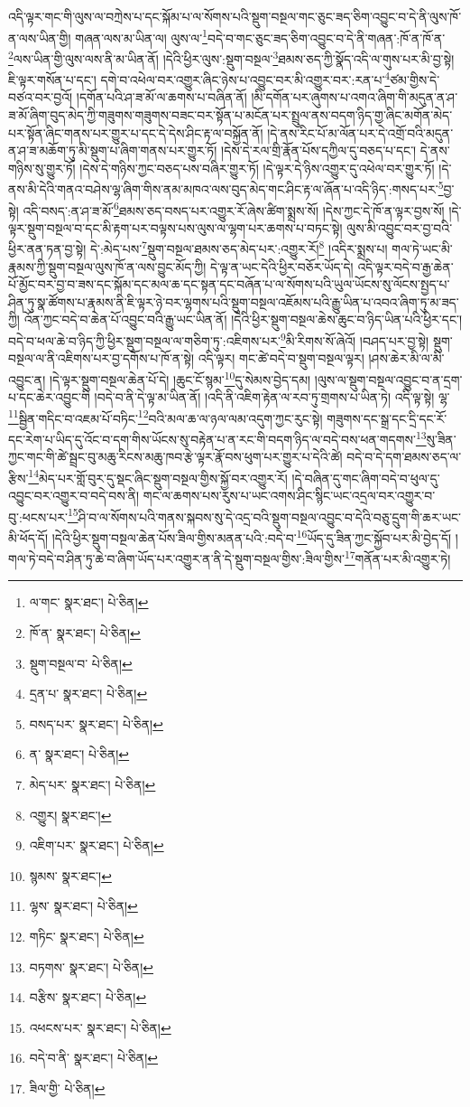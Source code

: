 འདི་ལྟར་གང་གི་ལུས་ལ་བཀྲེས་པ་དང་སྐོམ་པ་ལ་སོགས་པའི་སྡུག་བསྔལ་གང་ཅུང་ཟད་ཅིག་འབྱུང་བ་དེ་ནི་ལུས་ཁོ་ན་ལས་ཡིན་གྱི། གཞན་ལས་མ་ཡིན་ལ། ལུས་ལ་\footnote{ལ་གང་  སྣར་ཐང་།  པེ་ཅིན། }བདེ་བ་གང་ཅུང་ཟད་ཅིག་འབྱུང་བ་དེ་ནི་གཞན་:ཁོ་ན་ཁོ་ན་\footnote{ཁོ་ན་  སྣར་ཐང་།  པེ་ཅིན། }ལས་ཡིན་གྱི་ལུས་ལས་ནི་མ་ཡིན་ནོ། །དེའི་ཕྱིར་ལུས་:སྡུག་བསྔལ་\footnote{སྡུག་བསྔལ་བ་  པེ་ཅིན། }ཐམས་ཅད་ཀྱི་སྣོད་འདི་ལ་གུས་པར་མི་བྱ་སྟེ། ཇི་ལྟར་གསོན་པ་དང་། དགེ་བ་འཕེལ་བར་འགྱུར་ཞིང་ཉེས་པ་འབྱུང་བར་མི་འགྱུར་བར་:རན་པ་\footnote{དྲན་པ་  སྣར་ཐང་།  པེ་ཅིན། }ཙམ་གྱིས་དེ་བཙའ་བར་བྱའོ། །དགོན་པའི་ཤ་ཟ་མོ་ལ་ཆགས་པ་བཞིན་ནོ། །མི་དགོན་པར་ཞུགས་པ་འགའ་ཞིག་གི་མདུན་ན་ཤ་ཟ་མོ་ཞིག་བུད་མེད་ཀྱི་གཟུགས་གཟུགས་བཟང་བར་སྟོན་པ་མངོན་པར་སྤྲུལ་ནས་བདག་ཉིད་གྱ་ཞིང་མགོན་མེད་པར་སྟོན་ཞིང་གནས་པར་གྱུར་པ་དང་དེ་དེས་ཤིང་རྟ་ལ་བསྐྱོན་ནོ། །དེ་ནས་རིང་པོ་མ་ལོན་པར་དེ་འགྲོ་བའི་མདུན་ན་ཤ་ཟ་མཆོག་ཏུ་མི་སྡུག་པ་ཞིག་གནས་པར་གྱུར་ཏོ། །དེས་དེ་རལ་གྲི་རྣོན་པོས་དཀྱིལ་དུ་བཅད་པ་དང་། དེ་ནས་གཉིས་སུ་གྱུར་ཏོ། །དེས་དེ་གཉིས་ཀྱང་བཅད་པས་བཞིར་གྱུར་ཏོ། །དེ་ལྟར་དེ་ཉིས་འགྱུར་དུ་འཕེལ་བར་གྱུར་ཏོ། །དེ་ནས་མི་དེའི་གནའ་བཤེས་ལྷ་ཞིག་གིས་ནམ་མཁའ་ལས་བུད་མེད་གང་ཤིང་རྟ་ལ་ཞོན་པ་འདི་ཉིད་:གསད་པར་\footnote{བསད་པར་  སྣར་ཐང་།  པེ་ཅིན། }བྱ་སྟེ། འདི་བསད་:ན་ཤ་ཟ་མོ་\footnote{ན་  སྣར་ཐང་།  པེ་ཅིན། }ཐམས་ཅད་བསད་པར་འགྱུར་རོ་ཞེས་ཚིག་སྨྲས་སོ། །དེས་ཀྱང་དེ་ཁོ་ན་ལྟར་བྱས་སོ། །དེ་ལྟར་སྡུག་བསྔལ་བ་དང་མི་རྟག་པར་བལྟས་པས་ལུས་ལ་ལྷག་པར་ཆགས་པ་བཏང་སྟེ། ལུས་མི་འབྱུང་བར་བྱ་བའི་ཕྱིར་ནན་ཏན་བྱ་སྟེ། དེ་:མེད་པས་\footnote{མེད་པར་  སྣར་ཐང་།  པེ་ཅིན། }སྡུག་བསྔལ་ཐམས་ཅད་མེད་པར་:འགྱུར་རོ།\footnote{འགྱུར།  སྣར་ཐང་། } །འདིར་སྨྲས་པ། གལ་ཏེ་ཡང་མི་རྣམས་ཀྱི་སྡུག་བསྔལ་ལུས་ཁོ་ན་ལས་བྱུང་མོད་ཀྱི། དེ་ལྟ་ན་ཡང་དེའི་ཕྱིར་བཅོར་ཡོད་དེ། འདི་ལྟར་བདེ་བ་རྒྱ་ཆེན་པོ་མྱོང་བར་བྱ་བ་ཟས་དང་སྐོམ་དང་མལ་ཆ་དང་སྟན་དང་བཞོན་པ་ལ་སོགས་པའི་ཡུལ་ཡོངས་སུ་ལོངས་སྤྱད་པ་ཤིན་ཏུ་སྣ་ཚོགས་པ་རྣམས་ནི་ཇི་ལྟར་ཉེ་བར་ལྷགས་པའི་སྡུག་བསྔལ་འཇོམས་པའི་རྒྱུ་ཡིན་པ་འབའ་ཞིག་ཏུ་མ་ཟད་ཀྱི། འོན་ཀྱང་བདེ་བ་ཆེན་པོ་འབྱུང་བའི་རྒྱུ་ཡང་ཡིན་ནོ། །དེའི་ཕྱིར་སྡུག་བསྔལ་ཆེས་ཆུང་བ་ཉིད་ཡིན་པའི་ཕྱིར་དང་། བདེ་བ་ཕལ་ཆེ་བ་ཉིད་ཀྱི་ཕྱིར་སྡུག་བསྔལ་ལ་གཅིག་ཏུ་:འཇིགས་པར་\footnote{འཇིག་པར་  སྣར་ཐང་།  པེ་ཅིན། }མི་རིགས་སོ་ཞེའོ། །བཤད་པར་བྱ་སྟེ། སྡུག་བསྔལ་ལ་ནི་འཇིགས་པར་བྱ་དགོས་པ་ཁོ་ན་སྟེ། འདི་ལྟར། གང་ཚེ་བདེ་བ་སྡུག་བསྔལ་ལྟར། །ཤས་ཆེར་མི་ལ་མི་འབྱུང་ན། །དེ་ལྟར་སྡུག་བསྔལ་ཆེན་པོ་དེ། །ཆུང་ངོ་སྙམ་\footnote{སྙམས་  སྣར་ཐང་། }དུ་སེམས་བྱེད་དམ། །ལུས་ལ་སྡུག་བསྔལ་འབྱུང་བ་ན་དྲག་པ་དང་ཆེར་འབྱུང་གི །བདེ་བ་ནི་དེ་ལྟ་མ་ཡིན་ནོ། །འདི་ནི་འཇིག་རྟེན་ལ་རབ་ཏུ་གྲགས་པ་ཡིན་ཏེ། འདི་ལྟ་སྟེ། ལྷ་\footnote{ལྷས་  སྣར་ཐང་།  པེ་ཅིན། }སྦྱིན་གདིང་བ་འཇམ་པོ་བཏིང་\footnote{གཏིང་  སྣར་ཐང་།  པེ་ཅིན། }བའི་མལ་ཆ་ལ་ཉལ་ལམ་འདུག་ཀྱང་རུང་སྟེ། གཟུགས་དང་སྒྲ་དང་དྲི་དང་རོ་དང་རེག་པ་ཡིད་དུ་འོང་བ་དག་གིས་ཡོངས་སུ་བརྟེན་པ་ན་རང་གི་བདག་ཉིད་ལ་བདེ་བས་ཕན་གདགས་\footnote{བཏགས་  སྣར་ཐང་།  པེ་ཅིན། }སུ་ཟིན་ཀྱང་གང་གི་ཚེ་སྦྲང་བུ་མཆུ་རིངས་མཆུ་ཁབ་རྩེ་ལྟར་རྣོ་བས་ཕུག་པར་གྱུར་པ་དེའི་ཚེ། བདེ་བ་དེ་དག་ཐམས་ཅད་ལ་རྩིས་\footnote{བརྩིས་  སྣར་ཐང་།  པེ་ཅིན། }མེད་པར་གློ་བུར་དུ་སྡང་ཞིང་སྡུག་བསྔལ་གྱིས་སྐྱོ་བར་འགྱུར་རོ། །དེ་བཞིན་དུ་གང་ཞིག་བདེ་བ་ཕུལ་དུ་འབྱུང་བར་འགྱུར་བ་བདེ་བས་ནི། གང་ལ་ཆགས་པས་རུས་པ་ཡང་འགས་ཤིང་སྙིང་ཡང་འདྲལ་བར་འགྱུར་བ་བུ་:ཕངས་པར་\footnote{འཕངས་པར་  སྣར་ཐང་།  པེ་ཅིན། }ཤི་བ་ལ་སོགས་པའི་གནས་སྐབས་སུ་དེ་འདྲ་བའི་སྡུག་བསྔལ་འབྱུང་བ་དེའི་བཅུ་དྲུག་གི་ཆར་ཡང་མི་ཕོད་དོ། །དེའི་ཕྱིར་སྡུག་བསྔལ་ཆེན་པོས་ཟིལ་གྱིས་མནན་པའི་:བདེ་བ་\footnote{བདེ་བ་ནི་  སྣར་ཐང་།  པེ་ཅིན། }ཡོད་དུ་ཟིན་ཀྱང་སྐྱོབ་པར་མི་བྱེད་དོ། །གལ་ཏེ་བདེ་བ་ཤིན་ཏུ་ཆེ་བ་ཞིག་ཡོད་པར་འགྱུར་ན་ནི་དེ་སྡུག་བསྔལ་གྱིས་:ཟིལ་གྱིས་\footnote{ཟིལ་གྱི་  པེ་ཅིན། }གནོན་པར་མི་འགྱུར་ཏེ། 